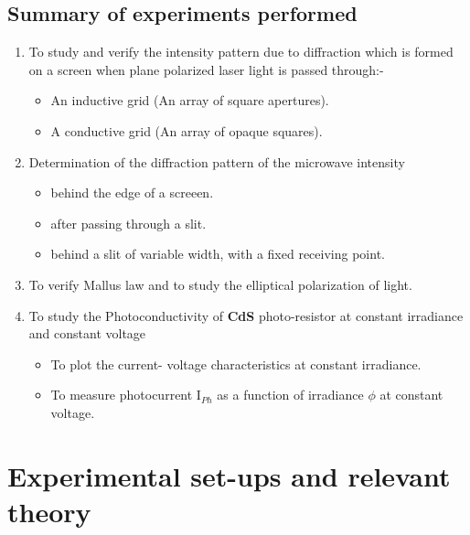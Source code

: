 \documentclass[12pt]{report}
\begin{document}
\section{Summary of experiments performed}
\begin{enumerate}
	\item To study and verify the intensity pattern due to diffraction which is formed on a screen when plane polarized laser light is passed through:-
	\begin{itemize}
		\item An inductive grid (An array of square apertures).
		\item A conductive grid (An array of opaque squares).
	\end{itemize}
	\item Determination of the diffraction pattern of the microwave intensity 
	\begin{itemize}
		\item behind the edge of a screeen.
		\item after passing through a slit.
		\item behind a slit of variable width, with a fixed receiving point.
	\end{itemize}
	\item To verify Mallus law and to study the elliptical polarization of light.
	\item  To study the Photoconductivity of \textbf{CdS} photo-resistor at constant irradiance and constant voltage 
	\begin{itemize}
		\item To plot the current- voltage characteristics at constant irradiance. 
		\item To measure photocurrent I$_{Ph}$ as a function of irradiance $\phi$ at constant voltage. 
	\end{itemize}
\end{enumerate}

\chapter{Experimental set-ups and relevant theory}
\end{document}
